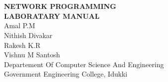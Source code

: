 \chapter*{}
\thispagestyle{empty}
\begin{center}
	\Huge{\textbf{NETWORK PROGRAMMING}}\\
	\huge{\textbf{LABORATARY MANUAL}}
	\\[9em] \LARGE {Amal P.M}\\ \LARGE {Nithish Divakar}\\ \LARGE {Rakesh K.R}\\ \LARGE {Vishnu M Santosh} \\[9em]
	\LARGE{Departement Of Computer Science And Engineering}\\
	\Large{Government Engineering College, Idukki}\\
\end{center}
